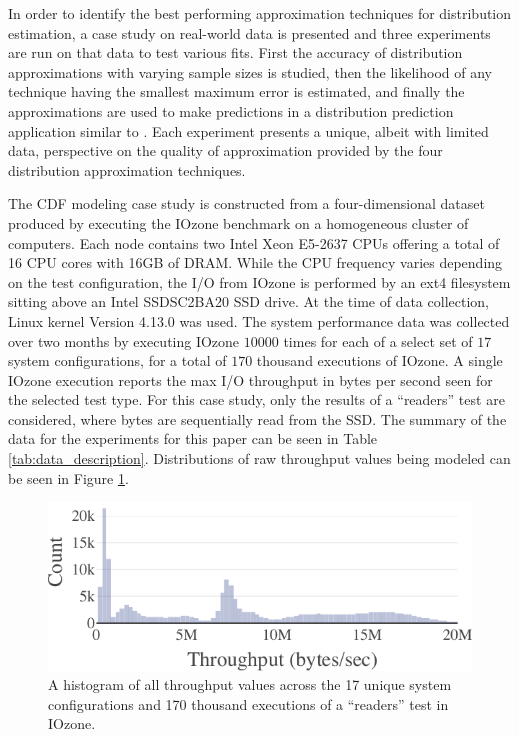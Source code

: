 \documentclass[letterpaper, 10 pt, conference]{IEEEtran}  %
\begin{document}
In order to identify the best performing approximation techniques for distribution estimation, a case study on real-world data is presented and three experiments are run on that data to test various fits. First the accuracy of distribution approximations with varying sample sizes is studied, then the likelihood of any technique having the smallest maximum error is estimated, and finally the approximations are used to make predictions in a distribution prediction application similar to \cite{lux2018nonparametric}. Each experiment presents a unique, albeit with limited data, perspective on the quality of approximation provided by the four distribution approximation techniques.

The CDF modeling case study is constructed from a four-dimensional dataset produced by executing the IOzone benchmark \cite{iozone} on a homogeneous cluster of computers. Each node contains two Intel Xeon E5-2637 CPUs offering a total of 16 CPU cores with 16GB of DRAM. While the CPU frequency varies depending on the test configuration, the I/O from IOzone is performed by an ext4 filesystem sitting above an Intel SSDSC2BA20 SSD drive. At the time of data collection, Linux kernel Version 4.13.0 was used. The system performance data was collected over two months by executing IOzone  $10000$ times for each of a select set of $17$ system configurations, for a total of $170$ thousand executions of IOzone. A single IOzone execution reports the max I/O throughput in bytes per second seen for the selected test type. For this case study, only the results of a ``readers'' test are considered, where bytes are sequentially read from the SSD. The summary of the data for the experiments for this paper can be seen in Table \ref{tab:data_description}. Distributions of raw throughput values being modeled can be seen in Figure \ref{fig:throughput_histogram}.

\begin{figure}
  \vspace{-.3cm}
  \includegraphics[width=.5\textwidth]{throughput-histogram.pdf}
  \caption{A histogram of all throughput values across the 17 unique system configurations and 170 thousand executions of a ``readers'' test in IOzone.}
  \label{fig:throughput_histogram}
\end{figure}
\end{document}
